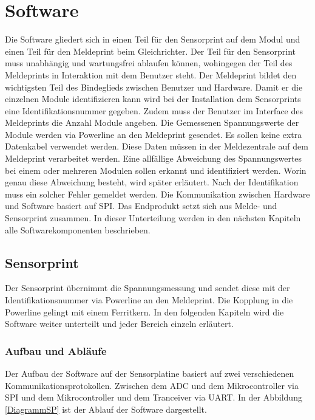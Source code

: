
\section{Software}
Die Software gliedert sich in einen Teil für den Sensorprint auf dem Modul und einen Teil für den Meldeprint beim Gleichrichter. Der Teil für den Sensorprint muss unabhängig und wartungsfrei ablaufen können, wohingegen der Teil des Meldeprints in Interaktion mit dem Benutzer steht. Der Meldeprint bildet den wichtigsten Teil des Bindeglieds zwischen Benutzer und Hardware. Damit er die einzelnen Module identifizieren kann wird bei der Installation dem Sensorprints eine Identifikationsnummer gegeben. Zudem muss der Benutzer im Interface des Meldeprints die Anzahl Module angeben.
Die Gemessenen Spannungswerte der Module werden via Powerline an den Meldeprint gesendet. Es sollen keine extra Datenkabel verwendet werden. Diese Daten müssen in der Meldezentrale auf dem Meldeprint verarbeitet werden. Eine allfällige Abweichung des Spannungswertes bei einem oder mehreren Modulen sollen erkannt und identifiziert werden. Worin genau diese Abweichung besteht, wird später erläutert. Nach der Identifikation muss ein solcher Fehler gemeldet werden. Die Kommunikation zwischen Hardware und Software basiert auf SPI. Das Endprodukt setzt sich aus Melde- und Sensorprint zusammen. In dieser Unterteilung werden in den nächsten Kapiteln alle Softwarekomponenten beschrieben.
\newpage
\subsection{Sensorprint}
Der Sensorprint übernimmt die Spannungsmessung und sendet diese mit der Identifikationsnummer via Powerline an den Meldeprint. Die Kopplung in die Powerline gelingt mit einem Ferritkern. In den folgenden Kapiteln wird die Software weiter unterteilt und jeder Bereich einzeln erläutert.
\subsubsection{Aufbau und Abläufe}
Der Aufbau der Software auf der Sensorplatine basiert auf zwei verschiedenen Kommunikationsprotokollen. Zwischen dem ADC und dem Mikrocontroller via SPI und dem Mikrocontroller und dem Tranceiver via UART. In der Abbildung \ref{DiagrammSP} ist der Ablauf der Software dargestellt.


